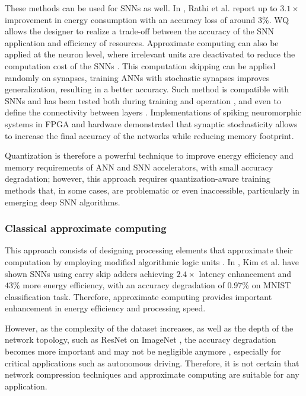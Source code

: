 These methods can be used for SNNs as well. In \cite{rathi2018stdp}, Rathi et al. report up to $3.1\times$ improvement in energy consumption with an accuracy loss of around $3\%$. WQ allows the designer to realize a trade-off between the accuracy of the SNN application and efficiency of resources. Approximate computing can also be applied at the neuron level, where irrelevant units are deactivated to reduce the computation cost of the SNNs \cite{sen2017approximate}. This computation skipping can be applied randomly on synapses, training ANNs with stochastic synapses improves generalization, resulting in a better accuracy\cite{srivastava2014dropout, wan2013regularization}. Such method is compatible with SNNs and has been tested both during training \cite{neftci2016stochastic, srinivasan2016magnetic} and operation \cite{buesing2011neural}, and even to define the connectivity between layers \cite{bellec2017deep, chen20184096}. Implementations of spiking neuromorphic systems in FPGA \cite{sheik2016synaptic} and hardware \cite{jerry2017ultra} demonstrated that synaptic stochasticity allows to increase the final accuracy of the networks while reducing memory footprint.

Quantization is therefore a powerful technique to improve energy efficiency and memory requirements of ANN and SNN accelerators, with small accuracy degradation; however, this approach requires quantization-aware training methods that, in some cases, are problematic or even inaccessible, particularly in emerging deep SNN algorithms\cite{zhang2018survey}.

\subsubsection{Classical approximate computing}
This approach consists of designing processing elements that approximate their computation by employing modified algorithmic logic units \cite{han2013approximate}. In \cite{kim2013energy}, Kim et al. have shown SNNs using carry skip adders achieving $2.4\times$ latency enhancement and $43\%$ more energy efficiency, with an accuracy degradation of 0.97\% on MNIST classification task. Therefore, approximate computing provides important enhancement in energy efficiency and processing speed.

However, as the complexity of the dataset increases, as well as the depth of the network topology, such as ResNet \cite{he2016deep} on ImageNet \cite{russakovsky2015imagenet}, the accuracy degradation becomes more important and may not be negligible anymore \cite{rastegari2016xnor}, especially for critical applications such as autonomous driving. Therefore, it is not certain that network compression techniques and approximate computing are suitable for any application.

